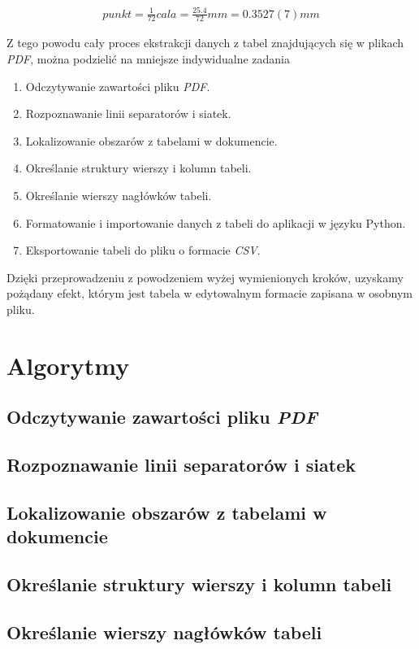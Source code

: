 \documentclass[a4paper,twoside,12pt]{book}
\begin{document}
\begin{align}
punkt = \frac{1}{72} cala = \frac{25.4}{72} mm = 0.3527(7) mm
\end{align}

Z tego powodu cały proces ekstrakcji danych z tabel znajdujących się w plikach \emph{PDF}, można podzielić na mniejsze indywidualne zadania

\begin{enumerate}
\item Odczytywanie zawartości pliku \emph{PDF}.
\item Rozpoznawanie linii separatorów i siatek.
\item Lokalizowanie obszarów z tabelami w dokumencie.
\item Określanie struktury wierszy i kolumn tabeli.
\item Określanie wierszy nagłówków tabeli.
\item Formatowanie i importowanie danych z tabeli do aplikacji w języku Python.
\item Eksportowanie tabeli do pliku o formacie \emph{CSV}.
\end{enumerate}

Dzięki przeprowadzeniu z powodzeniem wyżej wymienionych kroków, uzyskamy pożądany efekt, którym jest tabela w edytowalnym formacie zapisana w osobnym pliku.

\chapter{Algorytmy}

\section{Odczytywanie zawartości pliku \emph{PDF}}
\section{Rozpoznawanie linii separatorów i siatek}
\section{Lokalizowanie obszarów z tabelami w dokumencie}
\section{Określanie struktury wierszy i kolumn tabeli}
\section{Określanie wierszy nagłówków tabeli}
\end{document}
